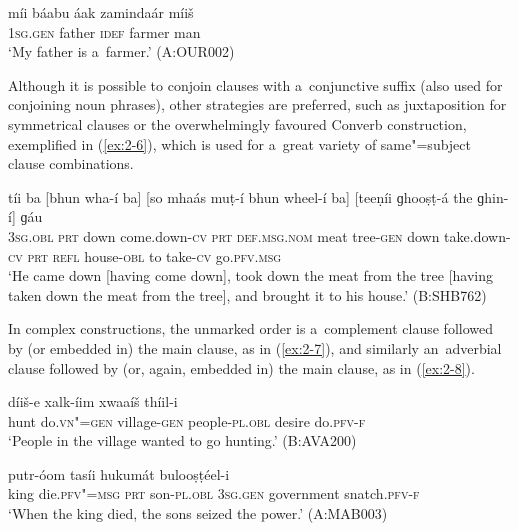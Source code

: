 \begin{exe}
\ex
\label{ex:2-5}
\gll míi báabu áak zamindaár míiš \\ 
\textsc{1sg.gen} father \textsc{idef} farmer man \\
\glt `My father is a~farmer.' (A:OUR002)
\end{exe}
Although it is possible to conjoin clauses with a~conjunctive suffix (also used for conjoining noun phrases), other strategies are preferred, such as juxtaposition for symmetrical clauses or the overwhelmingly favoured Converb construction, exemplified in (\ref{ex:2-6}), which is used for a~great variety of same"=subject clause combinations.

\begin{exe}
\ex
\label{ex:2-6}
\gll tíi ba [bhun wha-í ba] [so mhaás muṭ-í bhun wheel-í ba] [teeṇíi ɡhooṣṭ-á the ɡhin-í] ɡáu \\
\textsc{3sg.obl} \textsc{prt} down come.down-\textsc{cv} \textsc{prt} \textsc{def.msg.nom} meat tree-\textsc{gen} down take.down-\textsc{cv} \textsc{prt} \textsc{refl} house-\textsc{obl} to take-\textsc{cv} go.\textsc{pfv.msg} \\
\glt `He came down [having come down], took down the meat from the tree [having taken down the meat from the tree], and brought it to his house.' (B:SHB762)
\end{exe}

In complex constructions, the unmarked order is a~complement clause followed by (or embedded in) the main clause, as in (\ref{ex:2-7}), and similarly an~adverbial clause followed by (or, again, embedded in) the main clause, as in (\ref{ex:2-8}). 

\begin{exe}
\ex
\label{ex:2-7}
 díiš-e xalk-íim xwaaíš thíil-i \\
	hunt do.\textsc{vn"=gen} village\textsc{-gen} people\textsc{-pl.obl} desire do.\textsc{pfv-f} \\
\glt `People in the village wanted to go hunting.' (B:AVA200)
\end{exe}

\begin{exe}
\ex
\label{ex:2-8}
 putr-óom tasíi hukumát bulooṣṭéel-i \\
	king die.\textsc{pfv"=msg} \textsc{prt} son\textsc{-pl.obl} \textsc{3sg.gen} government snatch.\textsc{pfv-f} \\
\glt `When the king died, the sons seized the power.' (A:MAB003)
\end{exe}

